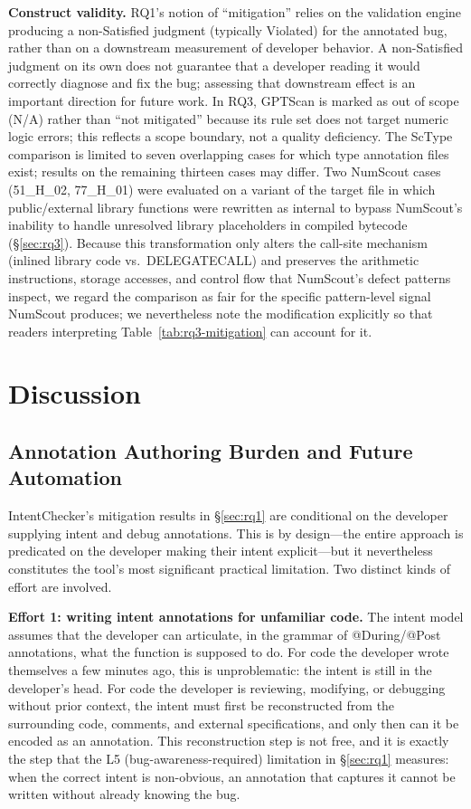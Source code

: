 \documentclass[pdflatex,sn-basic]{sn-jnl}%
\theoremstyle{thmstyleone}%
\theoremstyle{thmstyletwo}%
\theoremstyle{thmstylethree}%
\begin{document}
\smallskip
\noindent\textbf{Construct validity.}
RQ1's notion of ``mitigation'' relies on the validation engine producing a non-Satisfied judgment (typically Violated) for the annotated bug, rather than on a downstream measurement of developer behavior.
A non-Satisfied judgment on its own does not guarantee that a developer reading it would correctly diagnose and fix the bug; assessing that downstream effect is an important direction for future work.
In RQ3, GPTScan is marked as out of scope (N/A) rather than ``not mitigated'' because its rule set does not target numeric logic errors; this reflects a scope boundary, not a quality deficiency.
The ScType comparison is limited to seven overlapping cases for which type annotation files exist; results on the remaining thirteen cases may differ.
Two NumScout cases (51\_H\_02, 77\_H\_01) were evaluated on a variant of the target file in which public/external library functions were rewritten as internal to bypass NumScout's inability to handle unresolved library placeholders in compiled bytecode (§\ref{sec:rq3}).
Because this transformation only alters the call-site mechanism (inlined library code vs.\ DELEGATECALL) and preserves the arithmetic instructions, storage accesses, and control flow that NumScout's defect patterns inspect, we regard the comparison as fair for the specific pattern-level signal NumScout produces; we nevertheless note the modification explicitly so that readers interpreting Table~\ref{tab:rq3-mitigation} can account for it.

\section{Discussion}\label{sec:discussion}

\subsection{Annotation Authoring Burden and Future Automation}\label{sec:disc:burden}

IntentChecker's mitigation results in §\ref{sec:rq1} are conditional on the developer supplying intent and debug annotations.
This is by design---the entire approach is predicated on the developer making their intent explicit---but it nevertheless constitutes the tool's most significant practical limitation.
Two distinct kinds of effort are involved.

\smallskip
\noindent\textbf{Effort 1: writing intent annotations for unfamiliar code.}
The intent model assumes that the developer can articulate, in the grammar of @During/@Post annotations, what the function is supposed to do.
For code the developer wrote themselves a few minutes ago, this is unproblematic: the intent is still in the developer's head.
For code the developer is reviewing, modifying, or debugging without prior context, the intent must first be reconstructed from the surrounding code, comments, and external specifications, and only then can it be encoded as an annotation.
This reconstruction step is not free, and it is exactly the step that the L5 (bug-awareness-required) limitation in §\ref{sec:rq1} measures: when the correct intent is non-obvious, an annotation that captures it cannot be written without already knowing the bug.
\end{document}

